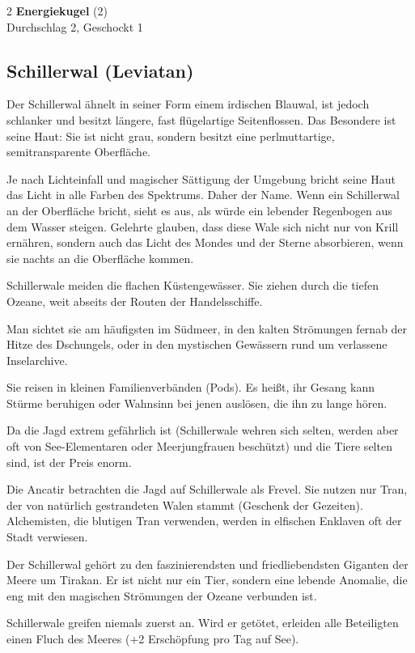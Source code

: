 \begin{multicols}{2}
    \textbf{Energiekugel} (2)\\
    Durchschlag 2, Geschockt 1\\


    \subsection*{Schillerwal (Leviatan)}

    Der Schillerwal ähnelt in seiner Form einem irdischen Blauwal, ist jedoch schlanker und besitzt längere, fast flügelartige Seitenflossen. Das Besondere ist seine Haut: Sie ist nicht grau, sondern besitzt eine perlmuttartige, semitransparente Oberfläche.

Je nach Lichteinfall und magischer Sättigung der Umgebung bricht seine Haut das Licht in alle Farben des Spektrums. Daher der Name. Wenn ein Schillerwal an der Oberfläche bricht, sieht es aus, als würde ein lebender Regenbogen aus dem Wasser steigen.
Gelehrte glauben, dass diese Wale sich nicht nur von Krill ernähren, sondern auch das Licht des Mondes und der Sterne absorbieren, wenn sie nachts an die Oberfläche kommen.

Schillerwale meiden die flachen Küstengewässer. Sie ziehen durch die tiefen Ozeane, weit abseits der Routen der Handelsschiffe.

Man sichtet sie am häufigsten im Südmeer, in den kalten Strömungen fernab der Hitze des Dschungels, oder in den mystischen Gewässern rund um verlassene Inselarchive.

Sie reisen in kleinen Familienverbänden (Pods). Es heißt, ihr Gesang kann Stürme beruhigen oder Wahnsinn bei jenen auslösen, die ihn zu lange hören.

Da die Jagd extrem gefährlich ist (Schillerwale wehren sich selten, werden aber oft von See-Elementaren oder Meerjungfrauen beschützt) und die Tiere selten sind, ist der Preis enorm.

Die Ancatir betrachten die Jagd auf Schillerwale als Frevel. Sie nutzen nur Tran, der von natürlich gestrandeten Walen stammt (Geschenk der Gezeiten). Alchemisten, die blutigen Tran verwenden, werden in elfischen Enklaven oft der Stadt verwiesen.

Der Schillerwal gehört zu den faszinierendsten und friedliebendsten Giganten der Meere um Tirakan. Er ist nicht nur ein Tier, sondern eine lebende Anomalie, die eng mit den magischen Strömungen der Ozeane verbunden ist.

Schillerwale greifen niemals zuerst an. Wird er getötet, erleiden alle Beteiligten einen Fluch des Meeres (+2 Erschöpfung pro Tag auf See).


\end{multicols}
